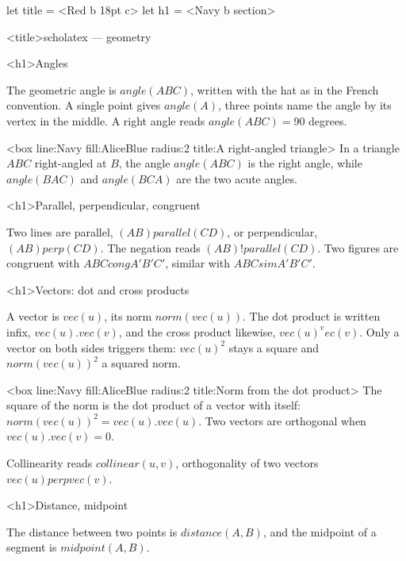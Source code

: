 \documentclass[
  margins=8,
  font=Latin Modern Roman,
  size=12,
  linespread=1.4,
  lang=en
]{scholatex}
\begin{document}
let title = <Red b 18pt c>
let h1    = <Navy b section>

<title>scholatex — geometry

<h1>Angles

The geometric angle is $angle(ABC)$, written with the hat as in the
French convention. A single point gives $angle(A)$, three points name the
angle by its vertex in the middle. A right angle reads $angle(ABC) = 90$
degrees.

<box line:Navy fill:AliceBlue radius:2 title:{A right-angled triangle}>{
In a triangle $ABC$ right-angled at $B$, the angle $angle(ABC)$ is the
right angle, while $angle(BAC)$ and $angle(BCA)$ are the two acute angles.
}

<h1>Parallel, perpendicular, congruent

Two lines are parallel, $(AB) parallel (CD)$, or perpendicular,
$(AB) perp (CD)$. The negation reads $(AB) !parallel (CD)$. Two figures
are congruent with $ABC cong A'B'C'$, similar with $ABC sim A'B'C'$.

<h1>Vectors: dot and cross products

A vector is $vec(u)$, its norm $norm(vec(u))$. The dot product is written
infix, $vec(u) . vec(v)$, and the cross product likewise, $vec(u) ^ vec(v)$.
Only a vector on both sides triggers them: $vec(u)^2$ stays a square and
$norm(vec(u))^2$ a squared norm.

<box line:Navy fill:AliceBlue radius:2 title:{Norm from the dot product}>{
The square of the norm is the dot product of a vector with itself:
$norm(vec(u))^2 = vec(u) . vec(u)$. Two vectors are orthogonal when
$vec(u) . vec(v) = 0$.
}

Collinearity reads $collinear(u, v)$, orthogonality of two vectors
$vec(u) perp vec(v)$.

<h1>Distance, midpoint

The distance between two points is $distance(A, B)$, and the midpoint of
a segment is $midpoint(A, B)$.
\end{document}

